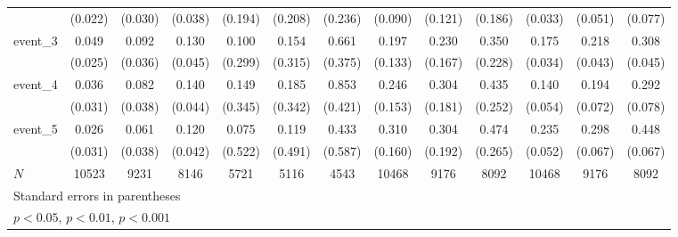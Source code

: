 {\begin{tabular}{l*{12}{c}}
            &     (0.022)         &     (0.030)         &     (0.038)         &     (0.194)         &     (0.208)         &     (0.236)         &     (0.090)         &     (0.121)         &     (0.186)         &     (0.033)         &     (0.051)         &     (0.077)         \\
[1em]
event\_3     &       0.049\sym{*}  &       0.092\sym{*}  &       0.130\sym{**} &       0.100         &       0.154         &       0.661         &       0.197         &       0.230         &       0.350         &       0.175\sym{***}&       0.218\sym{***}&       0.308\sym{***}\\
            &     (0.025)         &     (0.036)         &     (0.045)         &     (0.299)         &     (0.315)         &     (0.375)         &     (0.133)         &     (0.167)         &     (0.228)         &     (0.034)         &     (0.043)         &     (0.045)         \\
[1em]
event\_4     &       0.036         &       0.082\sym{*}  &       0.140\sym{**} &       0.149         &       0.185         &       0.853\sym{*}  &       0.246         &       0.304         &       0.435         &       0.140\sym{**} &       0.194\sym{**} &       0.292\sym{***}\\
            &     (0.031)         &     (0.038)         &     (0.044)         &     (0.345)         &     (0.342)         &     (0.421)         &     (0.153)         &     (0.181)         &     (0.252)         &     (0.054)         &     (0.072)         &     (0.078)         \\
[1em]
event\_5     &       0.026         &       0.061         &       0.120\sym{**} &       0.075         &       0.119         &       0.433         &       0.310         &       0.304         &       0.474         &       0.235\sym{***}&       0.298\sym{***}&       0.448\sym{***}\\
            &     (0.031)         &     (0.038)         &     (0.042)         &     (0.522)         &     (0.491)         &     (0.587)         &     (0.160)         &     (0.192)         &     (0.265)         &     (0.052)         &     (0.067)         &     (0.067)         \\
\hline
\(N\)       &       10523         &        9231         &        8146         &        5721         &        5116         &        4543         &       10468         &        9176         &        8092         &       10468         &        9176         &        8092         \\
\hline\hline
\multicolumn{13}{l}{\footnotesize Standard errors in parentheses}\\
\multicolumn{13}{l}{\footnotesize \sym{*} \(p<0.05\), \sym{**} \(p<0.01\), \sym{***} \(p<0.001\)}\\
\end{tabular}
}
